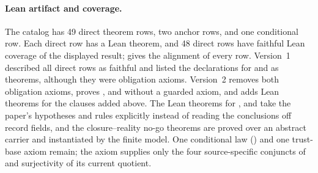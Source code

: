 \paragraph{Lean artifact and coverage.}
The catalog has 49 direct theorem rows, two anchor rows, and one conditional
row. Each direct row has a Lean theorem, and 48 direct rows have faithful Lean
coverage of the displayed result;  gives the alignment
of every row. Version~1 described all direct rows as faithful and
listed the declarations for  and  as theorems, although
they were obligation axioms. Version~2 removes both obligation axioms, proves
,  and  without a guarded axiom, and adds Lean
theorems for the clauses added above. The Lean theorems for ,
 and  take the paper's hypotheses and rules explicitly
instead of reading the conclusions off record fields, and the closure--reality
no-go theorems are proved over an abstract carrier and instantiated by the
finite model. One conditional law ()
and one trust-base axiom remain; the axiom supplies only the four
source-specific conjuncts of  and surjectivity of its current
quotient.

